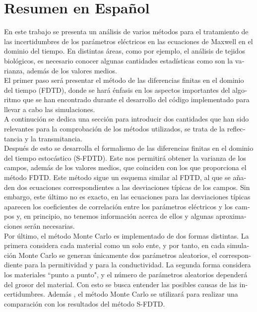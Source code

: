 \documentclass[12pt, oneside]{book}
\begin{document}
\chapter*{Resumen en Español}

\begin{otherlanguage}{spanish}
En este trabajo se presenta un análisis de varios métodos para el tratamiento de las incertidumbres de los parámetros eléctricos en las ecuaciones de Maxwell en el dominio del tiempo. En distintas áreas, como por ejemplo, el análisis de tejidos biológicos, es necesario conocer algunas cantidades estadísticas como son la varianza, además de los valores medios. \\
\indent El primer paso será presentar el método de las diferencias finitas en el dominio del tiempo (FDTD), donde se hará énfasis en los aspectos importantes del algoritmo que se han encontrado durante el desarrollo del código implementado para llevar a cabo las simulaciones. \\
\indent A continución se dedica una sección para introducir dos cantidades que han sido relevantes para la comprobación de los métodos utilizados, se trata de la reflectancia y la transmitancia. \\
\indent Después de esto se desarrolla el formalismo de las diferencias finitas en el dominio del tiempo estocástico (S-FDTD). Este nos permitirá obtener la varianza de los campos, además de los valores medios, que coinciden con los que proporciona el método FDTD. Este método sigue un esquema similar al FDTD, al que se añaden dos ecuaciones correspondientes a las desviaciones típicas de los campos. Sin embargo, este último no es exacto, en las ecuaciones para las desviaciones típicas aparecen los coeficientes de correlación entre los parámetros eléctricos y los campos y, en principio, no tenemos información acerca de ellos y algunas aproximaciones serán necesarias. \\
\indent Por último, el método Monte Carlo es implementado de dos formas distintas. La primera considera cada material como un solo ente, y por tanto, en cada simulación Monte Carlo se generan únicamente dos parámetros aleatorios, el correspondiente para la permitividad y para la conductividad. La segunda forma considera los materiales ``punto a punto", y el número de parámetros aleatorios dependerá del grosor del material. Con esto se busca entender las posibles causas de las incertidumbres. Además , el método Monte Carlo se utilizará para realizar una comparación con los resultados del método S-FDTD.

\end{otherlanguage}
\end{document}
